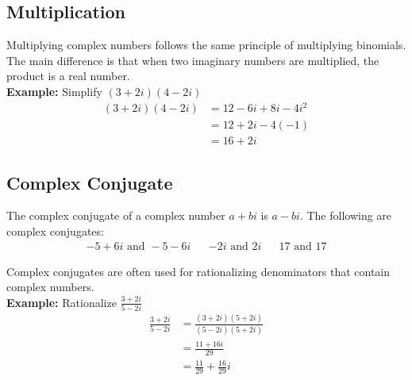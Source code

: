 \documentclass[12pt]{article}
\begin{document}
\subsection{Multiplication}
Multiplying complex numbers follows the same principle of multiplying binomials. The main difference is that when two imaginary numbers are multiplied, the product is a real number. \\

\textbf{Example:} Simplify $(3 + 2i)(4 - 2i)$
\begin{align*}
    (3 + 2i)(4 - 2i) &= 12 - 6i + 8i - 4i^2 \\
    &= 12 + 2i -4(-1) \\
    &= 16 + 2i
\end{align*}

\subsection{Complex Conjugate}
The complex conjugate of a complex number $a + bi$ is $a - bi$. The following are complex conjugates:
\begin{align*}
    -5 + 6i \text{ and } -5 -6i && -2i \text{ and } 2i && 17 \text{ and } 17
\end{align*}

Complex conjugates are often used for rationalizing denominators that contain complex numbers. \\

\textbf{Example:} Rationalize $\displaystyle{\frac{3 + 2i}{5 - 2i}}$
\begin{align*}
    \frac{3 + 2i}{5 - 2i} &= \frac{(3 + 2i)(5 + 2i)}{(5 - 2i)(5 + 2i)} \\
    &= \frac{11 + 16i}{29} \\
    &= \frac{11}{29} + \frac{16}{29}i
\end{align*}
\end{document}
